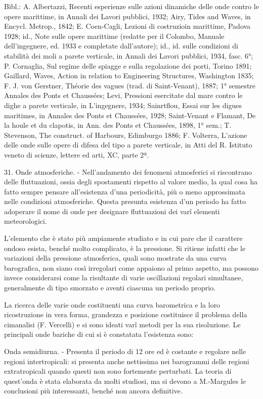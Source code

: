 \documentclass[a4paper]{article}
\begin{document}
Bibl.: A. Albertazzi, Recenti esperienze sulle azioni dinamiche delle onde contro le opere marittime, in Annali dei Lavori pubblici, 1932; Airy, Tides and Waves, in Encycl. Metrop., 1842; E. Coen-Cagli, Lezioni di costruzioin marittime, Padova 1928; id., Note sulle opere marittime (redatte per il Colombo, Manuale dell'ingegnere, ed. 1933 e completate dall'autore); id., id. sulle condizioni di stabilità dei moli a parete verticale, in Annali dei Lavori pubblici, 1934, fasc. 6°; P. Cornaglia, Sul regime delle spiagge e sulla regolazione dei porti, Torino 1891; Gaillard, Waves, Action in relation to Engineering Structures, Washington 1835; F. J. von Gerstner, Théorie des vagues (trad. di Saint-Venant), 1887; 1° semestre Annales des Ponts et Chaussées; Levi, Pressioni esercitate dal mare contro le dighe a parete verticale, in L'ingegnere, 1934; Sainrtflou, Essai sur les digues maritimes, in Annales des Ponts et Chaussées, 1928; Saint-Venant e Flamant, De la houle et du clapotis, in Ann. des Ponts et Chaussées, 1898, 1° sem.; T. Stevenson, The construct. of Harbours, Edimburgo 1886; F. Volterra, L'azione delle onde sulle opere di difesa del tipo a parete verticale, in Atti del R. Istituto veneto di scienze, lettere ed arti, XC, parte 2ª.

31. Onde atmosferiche. - Nell'andamento dei fenomeni atmosferici si riscontrano delle fluttuazioni, ossia degli spostamenti rispetto al valore medio, la qual cosa ha fatto sempre pensare all'esistenza d'una periodicità, più o meno approssimata nelle condizioni atmosferiche. Questa presunta esistenza d'un periodo ha fatto adoperare il nome di onde per designare fluttuazioni dei varî elementi meteorologici.

L'elemento che è stato più ampiamente studiato e in cui pare che il carattere ondoso esista, benché molto complicato, è la pressione. Si ritiene infatti che le variazioni della pressione atmosferica, quali sono mostrate da una curva barografica, non siano così irregolari come appaiono al primo aspetto, ma possono invece considerarsi come la risultante di varie oscillazioni regolari simultanee, generalmente di tipo smorzato e aventi ciascuna un periodo proprio.

La ricerca delle varie onde costituenti una curva barometrica e la loro ricostruzione in vera forma, grandezza e posizione costituisce il problema della cimanalisi (F. Vercelli) e si sono ideati varî metodi per la sua risoluzione. Le principali onde bariche di cui si è constatata l'esistenza sono:

Onda semidiurna. - Presenta il periodo di 12 ore ed è costante e regolare nelle regioni intertropicali: si presenta anche nettissima nei barogrammi delle regioni extratropicali quando questi non sono fortemente perturbati. La teoria di quest'onda è stata elaborata da molti studiosi, ma si devono a M.-Margules le conclusioni più interessanti, benché non ancora definitive.
\end{document}

